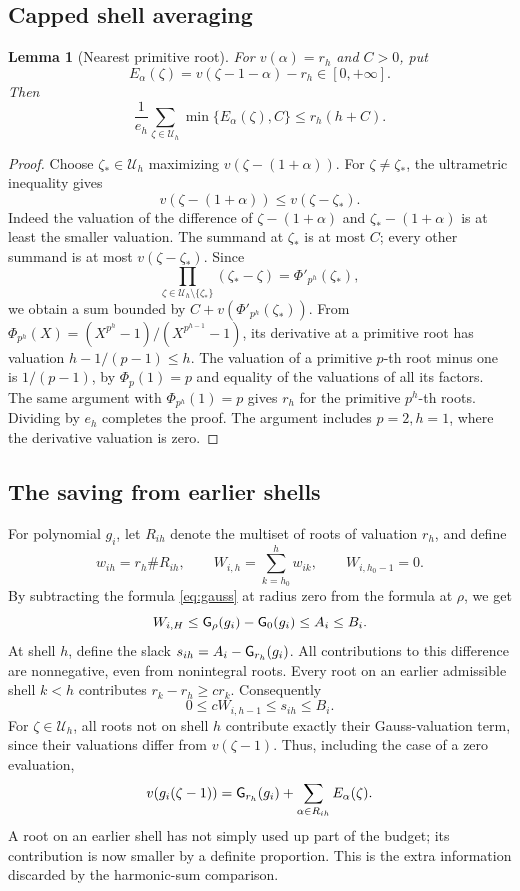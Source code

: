 \documentclass[11pt]{article}
\newtheorem{lemma}[theorem]{Lemma}
\theoremstyle{remark}\newtheorem{remark}[theorem]{Remark}
\begin{document}
\subsection{Capped shell averaging}
\begin{lemma}[Nearest primitive root]\label{lem:nearest}
For $v(\alpha)=r_h$ and $C>0$, put
\[
 E_\alpha(\zeta)=v(\zeta-1-\alpha)-r_h\in[0,+\infty].
\]
Then
\[
 \frac1{e_h}\sum_{\zeta\in\mathcal U_h}\min\{E_\alpha(\zeta),C\}
 \le r_h(h+C).
\]
\end{lemma}
\begin{proof}
Choose $\zeta_*\in\mathcal U_h$ maximizing $v(\zeta-(1+\alpha))$.
For $\zeta\ne\zeta_*$, the ultrametric inequality gives
\[
 v(\zeta-(1+\alpha))\le v(\zeta-\zeta_*).
\]
Indeed the valuation of the difference of $\zeta-(1+\alpha)$ and
$\zeta_*-(1+\alpha)$ is at least the smaller valuation. The summand at
$\zeta_*$ is at most $C$; every other summand is at most
$v(\zeta-\zeta_*)$. Since
\[
 \prod_{\zeta\in\mathcal U_h\setminus\{\zeta_*\}}(\zeta_*-\zeta)
 =\Phi'_{p^h}(\zeta_*),
\]
we obtain a sum bounded by $C+v(\Phi'_{p^h}(\zeta_*))$. From
$\Phi_{p^h}(X)=(X^{p^h}-1)/(X^{p^{h-1}}-1)$, its derivative at a
primitive root has valuation $h-1/(p-1)\le h$.
The valuation of a primitive $p$-th root minus one is $1/(p-1)$, by
$\Phi_p(1)=p$ and equality of the valuations of all its factors.
The same argument with $\Phi_{p^h}(1)=p$ gives $r_h$ for the primitive
$p^h$-th roots. Dividing by $e_h$ completes the proof. The argument
includes $p=2,h=1$, where the derivative valuation is zero.
\end{proof}

\subsection{The saving from earlier shells}
For polynomial $g_i$, let $R_{ih}$ denote the multiset of roots of
valuation $r_h$, and define
\[
 w_{ih}=r_h\#R_{ih},\qquad
 W_{i,h}=\sum_{k=h_0}^h w_{ik},\qquad W_{i,h_0-1}=0.
\]
By subtracting the formula \eqref{eq:gauss} at radius zero from the
formula at $\rho$, we get
\begin{equation}\label{eq:total}
 W_{i,H}\le \mathsf G_\rho(g_i)-\mathsf G_0(g_i)\le A_i\le B_i.
\end{equation}
At shell $h$, define the slack $s_{ih}=A_i-\mathsf G_{r_h}(g_i)$. All
contributions to this difference are nonnegative, even from nonintegral
roots. Every root on an earlier admissible shell $k<h$ contributes
$r_k-r_h\ge c r_k$. Consequently
\begin{equation}\label{eq:slack}
 0\le c W_{i,h-1}\le s_{ih}\le B_i.
\end{equation}
For $\zeta\in\mathcal U_h$, all roots not on shell $h$ contribute
exactly their Gauss-valuation term, since their valuations differ from
$v(\zeta-1)$. Thus, including the case of a zero evaluation,
\begin{equation}\label{eq:exact}
 v(g_i(\zeta-1))=\mathsf G_{r_h}(g_i)+\sum_{\alpha\in R_{ih}}E_\alpha(\zeta).
\end{equation}
A root on an earlier shell has not simply used up part of the budget;
its contribution is now smaller by a definite proportion. This is the
extra information discarded by the harmonic-sum comparison.
\end{document}
